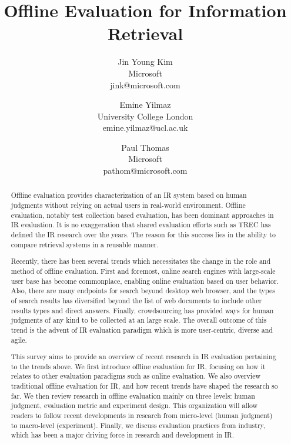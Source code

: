 \documentclass[openany]{now} %
\title{Offline Evaluation for Information Retrieval}
\author{
	Jin Young Kim \\
	Microsoft \\
	jink@microsoft.com
	\and
	Emine Yilmaz \\
	University College London \\
	emine.yilmaz@ucl.ac.uk
	\and
	Paul Thomas \\
	Microsoft \\
	pathom@microsoft.com
}
\begin{document}

\frontmatter  %

\maketitle

\tableofcontents

\mainmatter

\begin{abstract}
Offline evaluation provides characterization of an IR system based on human judgments without relying on actual users in real-world environment. Offline evaluation, notably test collection based evaluation, has been dominant approaches in IR evaluation. It is no exaggeration that shared evaluation efforts such as TREC has defined the IR research over the years. The reason for this success lies in the ability to compare retrieval systems in a reusable manner.

Recently, there has been several trends which necessitates the change in the role and method of offline evaluation. First and foremost, online search engines with large-scale user base has become commonplace, enabling online evaluation based on user behavior. Also, there are many endpoints for search beyond desktop web browser, and the types of search results has diversified beyond the list of web documents to include other results types and direct answers. Finally, crowdsourcing has provided ways for human judgments of any kind to be collected at an large scale. The overall outcome of this trend is the advent of IR evaluation paradigm which is more user-centric, diverse and agile.

This survey aims to provide an overview of recent research in IR evaluation pertaining to the trends above. We first introduce offline evaluation for IR, focusing on how it relates to other evaluation paradigms such as online evaluation. We also overview traditional offline evaluation for IR, and how recent trends have shaped the research so far. We then review research in offline evaluation mainly on three levels: human judgment, evaluation metric and experiment design. This organization will allow readers to follow recent developments in research from micro-level (human judgment) to macro-level (experiment). Finally, we discuss evaluation practices from industry, which has been a major driving force in research and development in IR.


\end{abstract}
\end{document}
